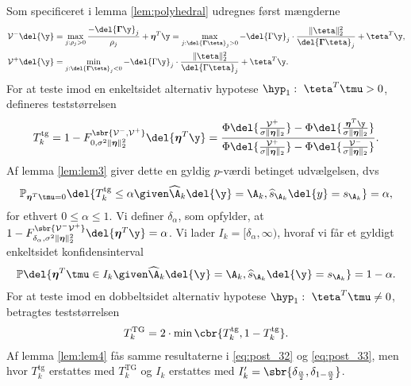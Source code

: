 Som specificeret i lemma \ref{lem:polyhedral} udregnes først mængderne
\begin{align*}
\mathcal{V}^- \del{\y} &=  \max_{j: \rho_j > 0} \frac{- \del{\boldsymbol{\Gamma} \y}_j}{\rho_j} + \boldsymbol{\eta}^T \y = \max_{j: \del{\boldsymbol{\Gamma} \teta}_j > 0} - \del{\Gamma \y}_j \cdot \frac{\Vert \teta \Vert_2^2}{\del{\boldsymbol{\Gamma} \teta}_j} + \teta^T \y, \\
\mathcal{V}^+ \del{\y} &=\min_{j: \del{\boldsymbol{\Gamma} \teta}_j < 0} - \del{\Gamma \y}_j \cdot \frac{\Vert \teta \Vert_2^2}{\del{\Gamma \teta}_j} + \teta^T \y.
\end{align*}
%
For at teste imod en enkeltsidet alternativ hypotese \(\hyp_1: \ \teta^T \tmu > 0\),  defineres teststørrelsen
\begin{align*}
T_k^\text{tg}=1- F_{0, \sigma^2 \Vert \boldsymbol{\eta} \Vert_2^2}^{\sbr{\mathcal{V}^-, \mathcal{V}^+}} \del{\boldsymbol{\eta}^T \y} = \frac{\Phi \del{\frac{\mathcal{V}^+}{\sigma \Vert \boldsymbol{\eta} \Vert_2}}-\Phi \del{\frac{\boldsymbol{\eta}^T \y}{\sigma  \Vert \boldsymbol{\eta} \Vert_2}}}{\Phi \del{\frac{\mathcal{V}^+}{\sigma  \Vert \boldsymbol{\eta} \Vert_2}}-\Phi \del{\frac{\mathcal{V}^-}{\sigma \Vert \boldsymbol{\eta} \Vert_2}}}.
\end{align*}
Af lemma \ref{lem:lem3} giver dette en gyldig \(p\)-værdi betinget udvælgelsen, dvs
\begin{align}
\mathbb{P}_{\boldsymbol{\eta}^T \tmu = 0} \del{T_k^\text{tg} \leq \alpha \given \widehat{\A}_k \del{\y} = \A_k, \widehat{s}_{\A_k} \del{y} = s_{\A_k}} = \alpha, \label{eq:post_32}
\end{align}
for ethvert \(0 \leq \alpha \leq 1\).
Vi definer  \(\delta_\alpha\), som opfylder, at \(1-F_{\delta_{\alpha}, \sigma^2 \Vert \boldsymbol{\eta} \Vert_2^2}^{\sbr{\mathcal{V}^- \mathcal{V}^+}} \del{\boldsymbol{\eta}^T \y} = \alpha\).
Vi lader \(I_k = [\delta_\alpha, \infty)\), hvoraf vi får et gyldigt enkeltsidet konfidensinterval
\begin{align}
\mathbb{P} \del{\boldsymbol{\eta}^T \tmu \in I_k \given \widehat{\A}_k \del{\y} = \A_k, \widehat{s}_{\A_k} \del{\y} = s_{\A_k}} = 1-\alpha. \label{eq:post_33}
\end{align}
For at teste imod en dobbeltsidet alternativ hypotese \(\hyp_1: \ \teta^T \tmu \neq 0\), betragtes teststørrelsen
\begin{align*}
T_k^\text{TG}= 2 \cdot \min \cbr{T_k^{\text{tg}}, 1-T_k^{\text{tg}}}.
\end{align*}
Af lemma \ref{lem:lem4} fås samme resultaterne i \eqref{eq:post_32} og \eqref{eq:post_33}, men hvor \(T_k^\text{tg}\) erstattes med \(T_k^\text{TG}\) og \(I_k\) erstattes med \(I_k'= \sbr{\delta_{\frac{\alpha}{2}}, \delta_{1-\frac{\alpha}{2}}}\).

